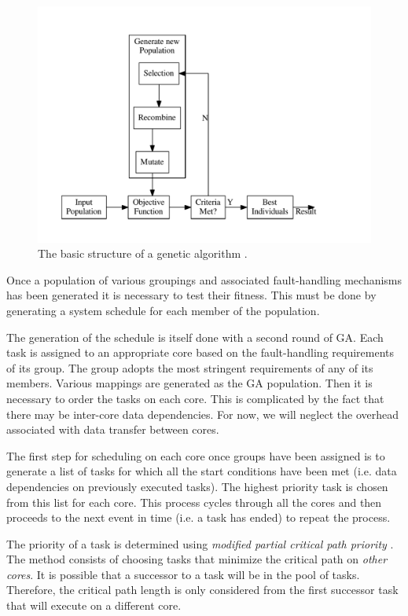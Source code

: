 \documentclass[table,11pt]{article}
\begin{document}
\begin{figure}[h]
\centering
\includegraphics[width=12cm]{figures/ga_ov}
\caption{The basic structure of a genetic algorithm \cite{geatbx}.}
\label{f:ga_ov}
\end{figure}

Once a population of various groupings and associated fault-handling mechanisms has been generated it is necessary to test their fitness. This must be done by generating a system schedule for each member of the population. 

The generation of the schedule is itself done with a second round of GA. Each task is assigned to an appropriate core based on the fault-handling requirements of its group. The group adopts the most stringent requirements of any of its members. Various mappings are generated as the GA population. Then it is necessary to order the tasks on each core. This is complicated by the fact that there may be inter-core data dependencies. For now, we will neglect the overhead associated with data transfer between cores.

The first step for scheduling on each core once groups have been assigned is to generate a list of tasks for which all the start conditions have been met (i.e. data dependencies on previously executed tasks). The highest priority task is chosen from this list for each core. This process cycles through all the cores and then proceeds to the next event in time (i.e. a task has ended) to repeat the process. 

The priority of a task is determined using \emph{modified partial critical path priority} \cite{eles2000scheduling}. The method consists of choosing tasks that minimize the critical path on \emph{other cores}. It is possible that a successor to a task will be in the pool of tasks. Therefore, the critical path length is only considered from the first successor task that will execute on a different core. 
\end{document}
